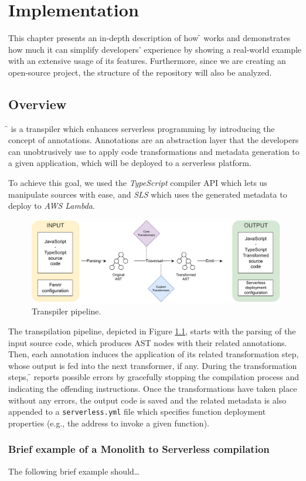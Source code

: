 \chapter{Implementation}
\label{chap:implementation}

This chapter presents an in-depth description of how \f{} works
and demonstrates how much it can simplify developers' experience
by showing a real-world example with an extensive usage of its features.
Furthermore, since we are creating an open-source project, the structure of
the repository will also be analyzed.


\section{Overview}

\f{} is a transpiler which enhances serverless programming by introducing the concept of annotations.
Annotations are an abstraction layer that the developers can unobtrusively use
to apply code transformations and metadata generation to a given application,
which will be deployed to a serverless platform.

To achieve this goal, we used the \textit{TypeScript}\cite{ts} compiler API which lets us
manipulate sources with ease, and \textit{SLS}\cite{sls} which
uses the generated metadata to deploy to \textit{AWS Lambda}.

\begin{figure}[H]
  \centering
  \includegraphics[width=\textwidth]{diagrams/pipeline}
  \caption{Transpiler pipeline.}
  \label{fig:pipeline}
\end{figure}


The transpilation pipeline, depicted in Figure \ref{fig:pipeline},
starts with the parsing of the input source code, which produces AST nodes with their related
annotations. Then, each annotation induces the application of its related
transformation step, whose output is fed into the next transformer, if any.
During the transformation steps, \f{} reports possible errors by gracefully
stopping the compilation process and indicating the offending instructions. Once
the transformations have taken place without any errors, the output code is saved
and the related metadata is also appended to a
\verb|serverless.yml| file which specifies function deployment
properties (e.g., the address to invoke a given function).

\subsection{Brief example of a Monolith to Serverless compilation}

The following brief example should\dots
